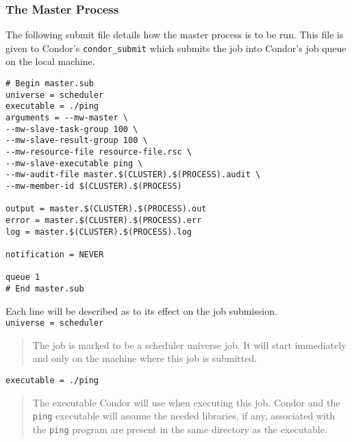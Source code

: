 \documentclass[titlepage,12pt]{book}
\newcommand{\exec}[1]{\texttt{#1}\xspace}
\newenvironment{explainline}[1]
	{\noindent\texttt{#1}\begin{quotation}}
	{\end{quotation}}
\begin{document}
\subsubsection{The Master Process}

The following submit file details how the master process is to be run. This
file is given to Condor's \exec{condor\_submit} which submits the job into
Condor's job queue on the local machine.

\begin{verbatim}
# Begin master.sub
universe = scheduler
executable = ./ping
arguments = --mw-master \
--mw-slave-task-group 100 \
--mw-slave-result-group 100 \
--mw-resource-file resource-file.rsc \
--mw-slave-executable ping \
--mw-audit-file master.$(CLUSTER).$(PROCESS).audit \
--mw-member-id $(CLUSTER).$(PROCESS)

output = master.$(CLUSTER).$(PROCESS).out
error = master.$(CLUSTER).$(PROCESS).err
log = master.$(CLUSTER).$(PROCESS).log

notification = NEVER

queue 1
# End master.sub
\end{verbatim}

Each line will be described as to its effect on the job submission.
\\

\begin{explainline}
{universe = scheduler}
The job is marked to be a scheduler universe job. It will start immediately
and only on the machine where this job is submitted.
\end{explainline}

\begin{explainline}
{executable = ./ping}
The executable Condor will use when executing this job.  Condor and
the \exec{ping} executable will assume the needed libraries, if
any, associated with the \exec{ping} program are present in the
same directory as the executable.
\end{explainline}
\end{document}
